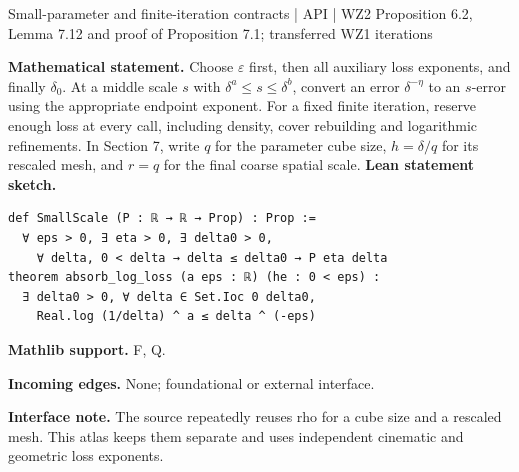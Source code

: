 \documentclass[10pt,a4paper]{article}
\begin{document}
\begin{minipage}{\linewidth}
\hypertarget{node-Iparams}{}
\begin{tcolorbox}[colback=white,colframe=apifg,colbacktitle=apibg,coltitle=ink,boxrule=0.45pt,arc=1.6mm,left=3mm,right=3mm,top=2mm,bottom=2mm,title={\sffamily\bfseries Quantifier API \hfill \texttt{Iparams}}]
{\sffamily\small\color{muted}Small-parameter and finite-iteration contracts | API | WZ2 Proposition 6.2, Lemma 7.12 and proof of Proposition 7.1; transferred WZ1 iterations}\par
\textbf{Mathematical statement.} Choose $\varepsilon$ first, then all auxiliary loss exponents, and finally $\delta_0$.
At a middle scale $s$ with $\delta^a\le s\le\delta^b$, convert an error $\delta^{-\eta}$ to an $s$-error using the appropriate endpoint exponent.
For a fixed finite iteration, reserve enough loss at every call, including density, cover rebuilding and logarithmic refinements.
In Section 7, write $q$ for the parameter cube size, $h=\delta/q$ for its rescaled mesh, and $r=q$ for the final coarse spatial scale.
\smallskip\textbf{Lean statement sketch.}
\begin{Verbatim}[fontsize=\small,breaklines=true,breakanywhere=true,tabsize=2]
def SmallScale (P : ℝ → ℝ → Prop) : Prop :=
  ∀ eps > 0, ∃ eta > 0, ∃ delta0 > 0,
    ∀ delta, 0 < delta → delta ≤ delta0 → P eta delta
theorem absorb_log_loss (a eps : ℝ) (he : 0 < eps) :
  ∃ delta0 > 0, ∀ delta ∈ Set.Ioc 0 delta0,
    Real.log (1/delta) ^ a ≤ delta ^ (-eps)
\end{Verbatim}
{\footnotesize\textbf{Mathlib support.} F, Q.\par
\textbf{Incoming edges.} None; foundational or external interface.\par}
{\footnotesize\textbf{Interface note.} The source repeatedly reuses rho for a cube size and a rescaled mesh. This atlas keeps them separate and uses independent cinematic and geometric loss exponents.}
\end{tcolorbox}\end{minipage}\par\medskip
\end{document}
